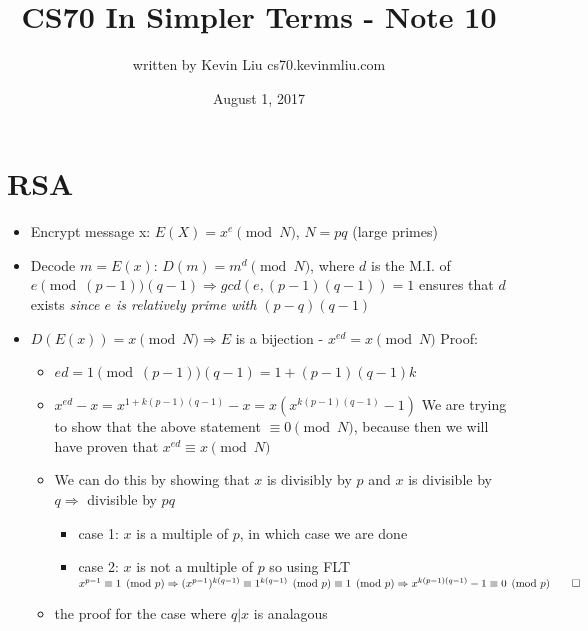 \documentclass[a4paper]{article}
\title{CS70 In Simpler Terms - Note 10}
\author{written by Kevin Liu cs70.kevinmliu.com}
\date{August 1, 2017}
\begin{document}
\maketitle

\section{RSA}
\begin{itemize}
    \item Encrypt message x: $E(X) = x^e\pmod N$, $N = pq$ (large primes)
    \item Decode $m = E(x)$: $D(m) = m^d \pmod N$, where $d$ is the M.I. of $e\pmod (p-1)(q-1) \Rightarrow gcd(e, (p-1)(q-1)) = 1$ ensures that $d$ exists \textit{since $e$ is relatively prime with $(p-q)(q-1)$}
    \item $D(E(x)) = x\pmod N \Rightarrow E$ is a bijection - \textbf{$x^{ed} = x\pmod N$} \newline Proof:
    \begin{itemize}
        \item $ed = 1\pmod (p-1)(q-1) = 1 + (p-1)(q-1)k$
        \item $x^{ed} - x = x^{1+k(p-1)(q-1)} - x = x(x^{k(p-1)(q-1)} - 1)$ \newline We are trying to show that the above statement $\equiv 0 \pmod N$, because then we will have proven that $x^{ed} \equiv x \pmod N$
        \item We can do this by showing that $x$ is divisibly by $p$ and $x$ is divisible by $q \Rightarrow$ divisible by $pq$
        \begin{itemize}
            \item case 1: $x$ is a multiple of $p$, in which case we are done
            \item case 2: $x$ is not a multiple of $p$ so using FLT \newline
        $x^{p-1} \equiv 1\pmod p \Rightarrow (x^{p-1})^{k(q-1)} \equiv 1^{k(q-1)} \pmod p \equiv 1 \pmod p \Rightarrow x^{k(p-1)(q-1)} -1 \equiv 0 \pmod p \qed$
        \end{itemize}
        \item the proof for the case where $q|x$ is analagous
     \end{itemize}
\end{itemize}
\end{document}
